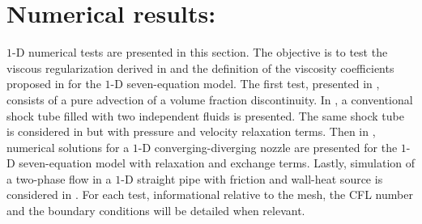 \section{Numerical results:}\label{sec:1d-num-res-sect4}
$1$-D numerical tests are presented in this section. The objective is to test the viscous regularization derived in  and the definition of the viscosity coefficients proposed in  for the $1$-D seven-equation model. The first test, presented in ,  consists of a pure advection of a volume fraction discontinuity. In , a conventional shock tube filled with two independent fluids is presented. The same shock tube is considered in  but with pressure and velocity relaxation terms. Then in , numerical solutions for a $1$-D converging-diverging nozzle are presented for the $1$-D seven-equation model with relaxation and exchange terms. Lastly, simulation of a two-phase flow in a $1$-D straight pipe with friction and wall-heat source is considered in . For each test, informational relative to the mesh, the CFL number and the boundary conditions will be detailed when relevant.
